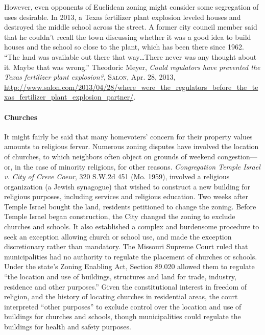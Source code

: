 However, even opponents of Euclidean zoning might consider some segregation of
uses desirable. In 2013, a Texas fertilizer plant explosion leveled houses and
destroyed the middle school across the street. A former city council member said
that he couldn't recall the town discussing whether it was a good idea to build
houses and the school so close to the plant, which has been there since 1962.
``The land was available out there that way\ldots There never was any thought
about it. Maybe that was wrong.'' Theodoric Meyer, \emph{Could regulators have
prevented the Texas fertilizer plant explosion?},
\textsc{Salon}, Apr. 28, 2013,
\url{http://www.salon.com/2013/04/28/where_were_the_regulators_before_the_texas_fertilizer_plant_explosion_partner/}.

\paragraph{Churches} It might fairly be said that many homevoters' concern for
their property values amounts to religious fervor. Numerous zoning disputes have
involved the location of churches, to which neighbors often object on grounds of
weekend congestion---or, in the case of minority religions, for other reasons.
\emph{Congregation Temple Israel v. City of Creve Coeur}, 320 S.W.2d 451 (Mo.
1959), involved a religious organization (a Jewish synagogue) that wished to
construct a new building for religious purposes, including services and
religious education. Two weeks after Temple Israel bought the land, residents
petitioned to change the zoning. Before Temple Israel began construction, the
City changed the zoning to exclude churches and schools. It also established a
complex and burdensome procedure to seek an exception allowing church or school
use, and made the exception discretionary rather than mandatory. The Missouri
Supreme Court ruled that municipalities had no authority to regulate the
placement of churches or schools. Under the state's Zoning Enabling Act, Section
89.020 allowed them to regulate ``the location and use of buildings, structures
and land for trade, industry, residence and other purposes.'' Given the
constitutional interest in freedom of religion, and the history of locating
churches in residential areas, the court interpreted ``other purposes'' to
exclude control over the location and use of buildings for churches and schools,
though municipalities could regulate the buildings for health and safety
purposes.

